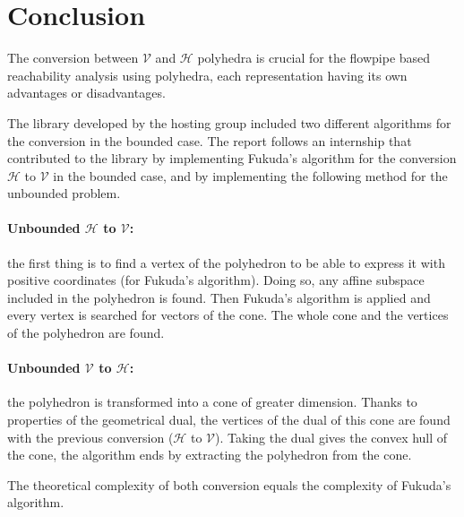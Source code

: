 \section{Conclusion}
\label{section_conclusion}
The conversion between $\mathcal{V}$ and $\mathcal{H}$ polyhedra is crucial for the flowpipe based reachability analysis using polyhedra, each representation having its own advantages or disadvantages.

The library developed by the hosting group included two different algorithms for the conversion in the bounded case. The report follows an internship that contributed to the library by implementing Fukuda's algorithm for the conversion $\mathcal{H}$ to $\mathcal{V}$ in the bounded case, and by implementing the following method for the unbounded problem.

\paragraph{Unbounded $\mathcal{H}$ to $\mathcal{V}$:} the first thing is to find a vertex of the polyhedron to be able to express it with positive coordinates (for Fukuda's algorithm). Doing so, any affine subspace included in the polyhedron is found. Then Fukuda's algorithm is applied and every vertex is searched for vectors of the cone. The whole cone and the vertices of the polyhedron are found. 

\paragraph{Unbounded $\mathcal{V}$ to $\mathcal{H}$:} the polyhedron is transformed into a cone of greater dimension. Thanks to properties of the geometrical dual, the vertices of the dual of this cone are found with the previous conversion ($\mathcal{H}$ to $\mathcal{V}$). Taking the dual gives the convex hull of the cone, the algorithm ends by extracting the polyhedron from the cone.

The theoretical complexity of both conversion equals the complexity of Fukuda's algorithm.